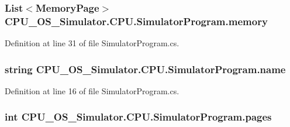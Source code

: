 \subsubsection[{memory}]{\setlength{\rightskip}{0pt plus 5cm}List$<${\bf Memory\+Page}$>$ C\+P\+U\+\_\+\+O\+S\+\_\+\+Simulator.\+C\+P\+U.\+Simulator\+Program.\+memory\hspace{0.3cm}{\ttfamily [private]}}\label{class_c_p_u___o_s___simulator_1_1_c_p_u_1_1_simulator_program_a402e53ae5daf1b6be0d5b7b705091c9c}


Definition at line 31 of file Simulator\+Program.\+cs.

\hypertarget{class_c_p_u___o_s___simulator_1_1_c_p_u_1_1_simulator_program_ad4797b5d81ceb01cd4207a97b7af36c5}{}
\subsubsection[{name}]{\setlength{\rightskip}{0pt plus 5cm}string C\+P\+U\+\_\+\+O\+S\+\_\+\+Simulator.\+C\+P\+U.\+Simulator\+Program.\+name\hspace{0.3cm}{\ttfamily [private]}}\label{class_c_p_u___o_s___simulator_1_1_c_p_u_1_1_simulator_program_ad4797b5d81ceb01cd4207a97b7af36c5}


Definition at line 16 of file Simulator\+Program.\+cs.

\hypertarget{class_c_p_u___o_s___simulator_1_1_c_p_u_1_1_simulator_program_ad86f4c2caa37cf36b8ab276ebe2a39bb}{}
\subsubsection[{pages}]{\setlength{\rightskip}{0pt plus 5cm}int C\+P\+U\+\_\+\+O\+S\+\_\+\+Simulator.\+C\+P\+U.\+Simulator\+Program.\+pages\hspace{0.3cm}{\ttfamily [private]}}\label{class_c_p_u___o_s___simulator_1_1_c_p_u_1_1_simulator_program_ad86f4c2caa37cf36b8ab276ebe2a39bb}


